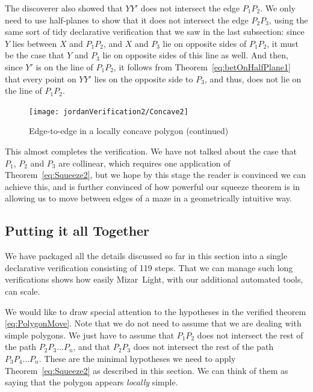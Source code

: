 The discoverer also showed that $YY'$ does not intersect the edge $P_1P_2$. We only need to use half-planes to show that it does not intersect the edge $P_2P_3$, using the same sort of tidy declarative verification that we saw in the last subsection: since $Y$ lies between $X$ and $P_1P_2$, and $X$ and $P_3$ lie on opposite sides of $P_1P_2$, it must be the case that $Y$ and $P_3$ lie on opposite sides of this line as well. And then, since $Y'$ is on the line of $P_1P_2$, it follows from Theorem~\ref{eq:betOnHalfPlane1} that every point on $YY'$ lies on the opposite side to $P_3$, and thus, does not lie on the line of $P_1P_2$. 

\begin{figure}
\centering\texttt{[image: jordanVerification2/Concave2]}
\caption{Edge-to-edge in a locally concave polygon (continued)}
\label{fig:Concave2}
\end{figure}

This almost completes the verification. We have not talked about the case that $P_1$, $P_2$ and $P_3$ are collinear, which requires one application of Theorem~\ref{eq:Squeeze2}, but we hope by this stage the reader is convinced we can achieve this, and is further convinced of how powerful our squeeze theorem is in allowing us to move between edges of a maze in a geometrically intuitive way.

\subsection{Putting it all Together}
We have packaged all the details discussed so far in this section into a single declarative verification consisting of 119 steps. That we can manage such long verifications shows how easily Mizar~Light, with our additional automated tools, can scale.

We would like to draw special attention to the hypotheses in the verified theorem \eqref{eq:PolygonMove}. Note that we do not need to assume that we are dealing with simple polygons. We just have to assume that $P_1P_2$ does not intersect the rest of the path $P_2P_3\ldots P_n$, and that $P_2P_3$ does not intersect the rest of the path $P_3P_4\ldots P_n$. These are the minimal hypotheses we need to apply Theorem~\ref{eq:Squeeze2} as described in this section. We can think of them as saying that the polygon appears \emph{locally} simple.

